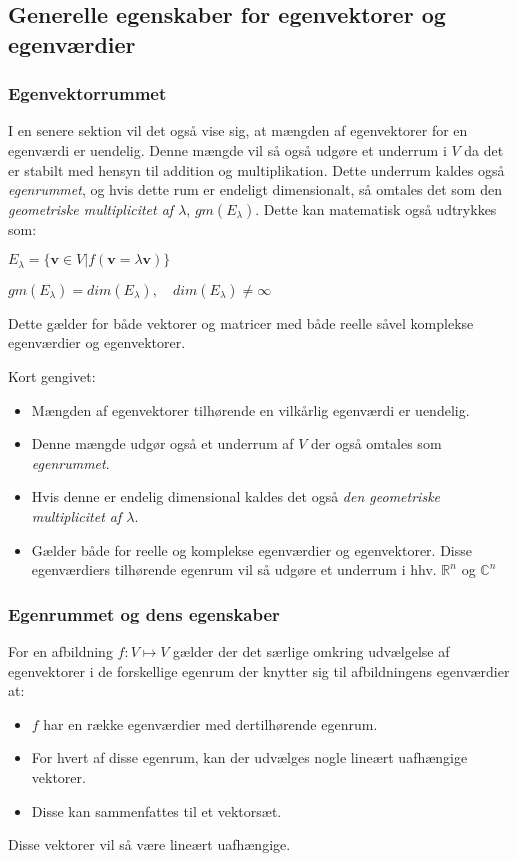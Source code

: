\documentclass{article}
\newcommand{\cent}[1]{\begin{center}#1\end{center}}
\begin{document}
	\subsection{Generelle egenskaber for egenvektorer og egenværdier}
	\subsubsection{Egenvektorrummet}
	I en senere sektion vil det også vise sig, at mængden af egenvektorer for en egenværdi er uendelig. Denne mængde vil så også udgøre et underrum i $V$ da det er stabilt med hensyn til addition og multiplikation. Dette underrum kaldes også \textit{egenrummet}, og hvis dette rum er endeligt dimensionalt, så omtales det som den \textit{geometriske multiplicitet af $\lambda$}, $gm(E_\lambda)$. Dette kan matematisk også udtrykkes som:
	
	\cent{$ E_\lambda = \{ \textbf{v} \in V | f(\textbf{v} = \lambda \textbf{v}) \}$}
	\cent{$ gm(E_\lambda) = dim(E_\lambda), \quad dim(E_\lambda)\neq \infty $}
	
	Dette gælder for både vektorer og matricer med både reelle såvel komplekse egenværdier og egenvektorer.
	
	Kort gengivet:
	
	\begin{itemize}
		\item Mængden af egenvektorer tilhørende en vilkårlig egenværdi er uendelig.
		\item Denne mængde udgør også et underrum af $V$ der også omtales som \textit{egenrummet}.
		\item Hvis denne er endelig dimensional kaldes det også \textit{den geometriske multiplicitet af $\lambda$}.
		\item Gælder både for reelle og komplekse egenværdier og egenvektorer.
		\subitem Disse egenværdiers tilhørende egenrum vil så udgøre et underrum i hhv. $ \mathbb{R}^n $ og $ \mathbb{C}^n $
	\end{itemize}
	\subsubsection{Egenrummet og dens egenskaber}
	For en afbildning $f : V \mapsto V$ gælder der det særlige omkring udvælgelse af egenvektorer i de forskellige egenrum der knytter sig til afbildningens egenværdier at:
	\begin{itemize}
		\item $f$ har en række egenværdier med dertilhørende egenrum.
		\item For hvert af disse egenrum, kan der udvælges nogle lineært uafhængige vektorer.
		\item Disse kan sammenfattes til et vektorsæt.
	\end{itemize}
	Disse vektorer vil så være lineært uafhængige.
\end{document}
